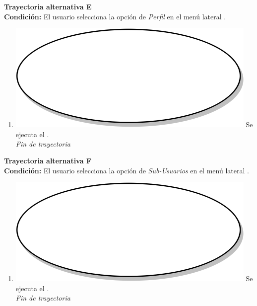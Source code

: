 \textbf{Trayectoria alternativa E} \label{cu3_ta_e} \\
\textbf{Condición:} El usuario selecciona la opción de \textit{Perfil} en el menú lateral \textbf{}. \\
 \begin{enumerate}[label=E\arabic*]
    \item {\includegraphics[scale=.05]{Capitulo3/img/proceso.png} Se ejecuta el \textbf{}.} \\
    \textit{Fin de trayectoria} \\
\end{enumerate}

\textbf{Trayectoria alternativa F} \label{cu3_ta_f} \\
\textbf{Condición:} El usuario selecciona la opción de \textit{Sub-Usuarios} en el menú lateral \textbf{}. \\
 \begin{enumerate}[label=F\arabic*]
    \item {\includegraphics[scale=.05]{Capitulo3/img/proceso.png} Se ejecuta el \textbf{}.} \\
    \textit{Fin de trayectoria} \\
\end{enumerate}


